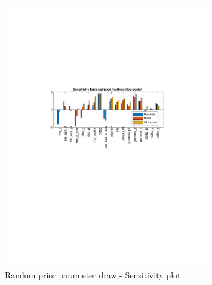 
\begin{figure}[H]
\centering 
\includegraphics[width=0.8\textwidth]{fiscal/identification/fiscal_sensitivity_Random_prior_params}
\caption{Random prior parameter draw  - Sensitivity plot.}\label{Fig:sensitivity:Random_prior_params}
\end{figure}

